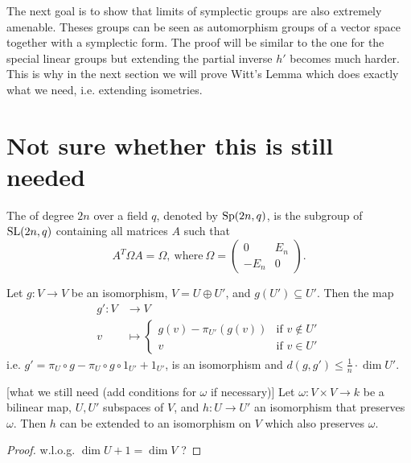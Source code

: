 The next goal is to show that limits of symplectic groups are also extremely amenable. Theses groups can be seen as automorphism groups of a vector space together with a symplectic form. The proof will be similar to the one for the special linear groups but extending the partial inverse $h'$ becomes much harder. This is why in the next section we will prove Witt's Lemma which does exactly what we need, i.e. extending isometries.

\section*{Not sure whether this is still needed}

\begin{definition}
The  of degree $2n$ over a field $q$, denoted by $\operatorname{Sp}(2n,q)$, is the subgroup of $\operatorname{SL}(2n,q)$ containing all matrices $A$ such that
\[A^T\Omega A=\Omega,\ \text{where}\ \Omega=\left(\begin{array}{cc}
0&E_n\\
-E_n&0
\end{array}\right).\]
\end{definition}

\begin{lemma}
Let $g\colon V\to V$ be an isomorphism, $V=U\oplus U'$, and $g(U')\subseteq U'$. %
Then the map 
\begin{align*}
g'\colon V&\to V\\
v&\mapsto
\begin{cases}
g(v)-\pi_{U'}(g(v)) &\text{if }v\notin U'\\
v &\text{if }v\in U'
\end{cases}
\end{align*}
i.e. $g'=\pi_U\circ g-\pi_U\circ g \circ1_{U'} +1_{U'}$, is an isomorphism and $d(g,g')\leq \frac{1}{n}\cdot\dim U'$.
\end{lemma}


\begin{lemma}\label{lem:extend}[what we still need (add conditions for $\omega$ if necessary)]
Let $\omega\colon V\times V\to k$ be a bilinear map, $U,U'$ subspaces of $V$, and $h\colon U\to U'$ an isomorphism that preserves $\omega$. Then $h$ can be extended to an isomorphism on $V$ which also preserves $\omega$.
\end{lemma}
\begin{proof}
w.l.o.g. $\dim U+1= \dim V$ ?
\end{proof}


